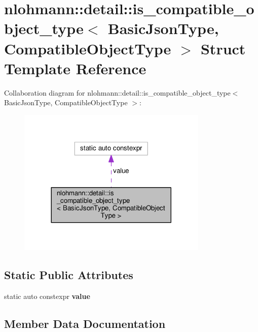 \hypertarget{structnlohmann_1_1detail_1_1is__compatible__object__type}{}\section{nlohmann\+:\+:detail\+:\+:is\+\_\+compatible\+\_\+object\+\_\+type$<$ Basic\+Json\+Type, Compatible\+Object\+Type $>$ Struct Template Reference}
\label{structnlohmann_1_1detail_1_1is__compatible__object__type}


Collaboration diagram for nlohmann\+:\+:detail\+:\+:is\+\_\+compatible\+\_\+object\+\_\+type$<$ Basic\+Json\+Type, Compatible\+Object\+Type $>$\+:\nopagebreak
\begin{figure}[H]
\begin{center}
\leavevmode
\includegraphics[width=257pt]{structnlohmann_1_1detail_1_1is__compatible__object__type__coll__graph}
\end{center}
\end{figure}
\subsection*{Static Public Attributes}
\begin{DoxyCompactItemize}
\item 
static auto constexpr {\bfseries value}
\end{DoxyCompactItemize}


\subsection{Member Data Documentation}
